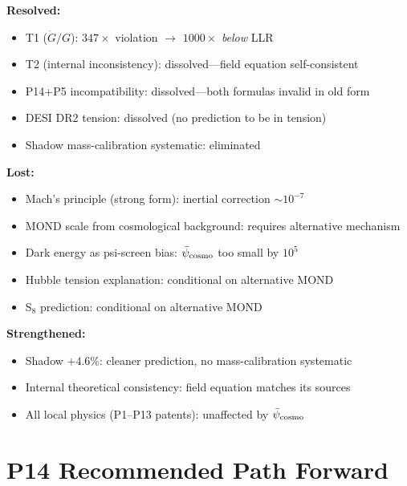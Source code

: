 \documentclass[11pt]{article}
\newcommand{\Gdot}{\dot{G}/G}
\newcommand{\psicosmo}{\bar{\psi}_{\rm cosmo}}
\begin{document}
\begin{tcolorbox}[colback=yellow!5!white, colframe=orange!60!black,
  title=\textbf{EM-Only Trade-Off Summary}]
\textbf{Resolved:}
\begin{itemize}[nosep]
\item T1 ($\Gdot$): $347\times$ violation $\to$ $1000\times$ \emph{below} LLR
\item T2 (internal inconsistency): dissolved---field equation self-consistent
\item P14+P5 incompatibility: dissolved---both formulas invalid in old form
\item DESI DR2 tension: dissolved (no prediction to be in tension)
\item Shadow mass-calibration systematic: eliminated
\end{itemize}

\textbf{Lost:}
\begin{itemize}[nosep]
\item Mach's principle (strong form): inertial correction $\sim 10^{-7}$
\item MOND scale from cosmological background: requires alternative mechanism
\item Dark energy as psi-screen bias: $\psicosmo$ too small by $10^5$
\item Hubble tension explanation: conditional on alternative MOND
\item S$_8$ prediction: conditional on alternative MOND
\end{itemize}

\textbf{Strengthened:}
\begin{itemize}[nosep]
\item Shadow $+4.6\%$: cleaner prediction, no mass-calibration systematic
\item Internal theoretical consistency: field equation matches its sources
\item All local physics (P1--P13 patents): unaffected by $\psicosmo$
\end{itemize}
\end{tcolorbox}

\section{P14 Recommended Path Forward}
\label{sec:P14-forward}
\end{document}
